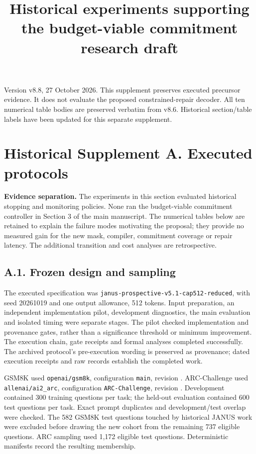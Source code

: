 \documentclass[
  12pt,
  a4paper,
]{article}
\title{Historical experiments supporting the budget-viable commitment
research draft}
\author{}
\date{}
\begin{document}
\maketitle

Version v8.8, 27 October 2026. This supplement preserves executed
precursor evidence. It does not evaluate the proposed constrained-repair
decoder. All ten numerical table bodies are preserved verbatim from
v8.6. Historical section/table labels have been updated for this
separate supplement.

\section{Historical Supplement A. Executed
protocols}\label{historical-supplement-a.-executed-protocols}

\textbf{Evidence separation.} The experiments in this section evaluated
historical stopping and monitoring policies. None ran the budget-viable
commitment controller in Section 3 of the main manuscript. The numerical
tables below are retained to explain the failure modes motivating the
proposal; they provide no measured gain for the new mask, compiler,
commitment coverage or repair latency. The additional transition and
cost analyses are retrospective.

\subsection{A.1. Frozen design and
sampling}\label{a.1.-frozen-design-and-sampling}

The executed specification was
\texttt{janus-prospective-v5.1-cap512-reduced}, with seed 20261019 and
one output allowance, 512 tokens. Input preparation, an independent
implementation pilot, development diagnostics, the main evaluation and
isolated timing were separate stages. The pilot checked implementation
and provenance gates, rather than a significance threshold or minimum
improvement. The execution chain, gate receipts and formal analyses
completed successfully. The archived protocol's pre-execution wording is
preserved as provenance; dated execution receipts and raw records
establish the completed work.

GSM8K used \texttt{openai/gsm8k}, configuration \texttt{main}, revision
\texttt{}. ARC-Challenge used
\texttt{allenai/ai2\_arc}, configuration \texttt{ARC-Challenge},
revision \texttt{}. Development
contained 300 training questions per task; the held-out evaluation
contained 600 test questions per task. Exact prompt duplicates and
development/test overlap were checked. The 582 GSM8K test questions
touched by historical JANUS work were excluded before drawing the new
cohort from the remaining 737 eligible questions. ARC sampling used
1,172 eligible test questions. Deterministic manifests record the
resulting membership.
\end{document}
